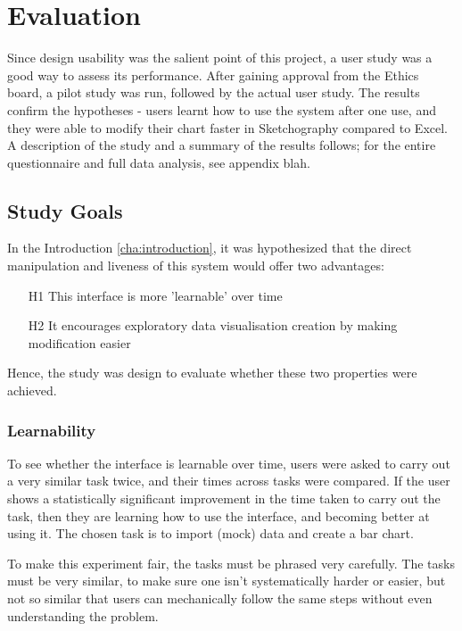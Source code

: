 \chapter{Evaluation}
Since design usability was the salient point of this project, a user study was a good way to assess its performance. After gaining approval from the Ethics board, a pilot study was run, followed by the actual user study. The results confirm the hypotheses - users learnt how to use the system after one use, and they were able to modify their chart faster in Sketchography compared to Excel. A description of the study and a summary of the results follows; for the entire questionnaire and full data analysis, see appendix blah.

\section{Study Goals}
In the Introduction \ref{cha:introduction}, it was hypothesized that the direct manipulation and liveness of this system would offer two advantages:

\begin{enumerate}
\item[H1] This interface is more 'learnable' over time
\item[H2] It encourages exploratory data visualisation creation by making modification easier
\end{enumerate}

Hence, the study was design to evaluate whether these two properties were achieved. 

\subsection*{Learnability}
To see whether the interface is learnable over time, users were asked to carry out a very similar task twice, and their times across tasks were compared. If the user shows a statistically significant improvement in the time taken to carry out the task, then they are learning how to use the interface, and becoming better at using it. The chosen task is to import (mock) data and create a bar chart.

To make this experiment fair, the tasks must be phrased very carefully. The tasks must be very similar, to make sure one isn't systematically harder or easier, but not so similar that users can mechanically follow the same steps without even understanding the problem.

